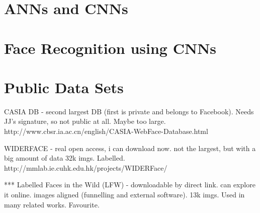 \section{ANNs and CNNs}
\section{Face Recognition using CNNs}
\section{Public Data Sets} 
CASIA DB - second largest DB (first is private and belongs to Facebook). Needs JJ's signature, so not public at all. Maybe too large. http://www.cbsr.ia.ac.cn/english/CASIA-WebFace-Database.html

WIDERFACE - real open access, i can download now. not the largest, but with a big amount of data 32k imgs. Labelled. http://mmlab.ie.cuhk.edu.hk/projects/WIDERFace/

*** Labelled Faces in the Wild (LFW) - downloadable by direct link. can explore it online. images aligned (funnelling and external software). 13k imgs. Used in many related works. Favourite. %
